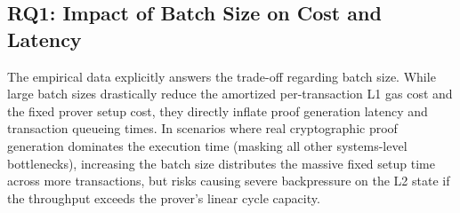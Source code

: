 \subsection{RQ1: Impact of Batch Size on Cost and Latency}
The empirical data explicitly answers the trade-off regarding batch size. While large batch sizes drastically reduce the amortized per-transaction L1 gas cost and the fixed prover setup cost, they directly inflate proof generation latency and transaction queueing times. In scenarios where real cryptographic proof generation dominates the execution time (masking all other systems-level bottlenecks), increasing the batch size distributes the massive fixed setup time across more transactions, but risks causing severe backpressure on the L2 state if the throughput exceeds the prover's linear cycle capacity.
